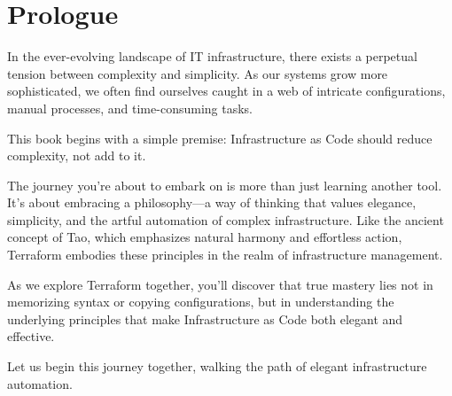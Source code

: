 \chapter*{Prologue}

In the ever-evolving landscape of IT infrastructure, there exists a perpetual tension between complexity and simplicity. As our systems grow more sophisticated, we often find ourselves caught in a web of intricate configurations, manual processes, and time-consuming tasks.

This book begins with a simple premise: Infrastructure as Code should reduce complexity, not add to it.

The journey you're about to embark on is more than just learning another tool. It's about embracing a philosophy—a way of thinking that values elegance, simplicity, and the artful automation of complex infrastructure. Like the ancient concept of Tao, which emphasizes natural harmony and effortless action, Terraform embodies these principles in the realm of infrastructure management.

As we explore Terraform together, you'll discover that true mastery lies not in memorizing syntax or copying configurations, but in understanding the underlying principles that make Infrastructure as Code both elegant and effective.

Let us begin this journey together, walking the path of elegant infrastructure automation.

\clearpage
